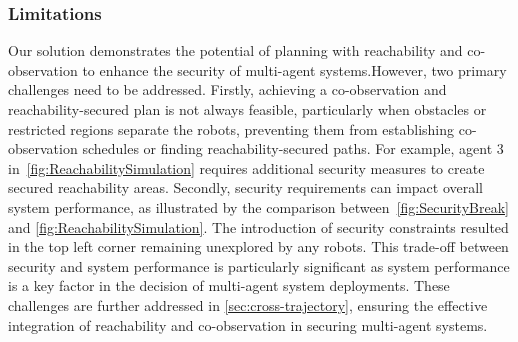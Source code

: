 \documentclass[10pt,twocolumn,twoside]{IEEEtran}
\newcommand{\news}{\color{blue}}
\begin{document}



\subsubsection{Limitations}\label{sec:reachability-discussion}
Our solution demonstrates the potential of planning with reachability and co-observation to enhance the security of multi-agent systems.{\news However, two primary challenges need to be addressed. Firstly, achieving a co-observation and reachability-secured plan is not always feasible, particularly when obstacles or restricted regions separate the robots, preventing them from establishing co-observation schedules or finding reachability-secured paths. For example, agent 3 in~\cref{fig:ReachabilitySimulation} requires additional security measures to create secured reachability areas. Secondly, security requirements can impact overall system performance, as illustrated by the comparison between~\cref{fig:SecurityBreak} and \cref{fig:ReachabilitySimulation}. The introduction of security constraints resulted in the top left corner remaining unexplored by any robots. This trade-off between security and system performance is particularly significant as system performance is a key factor in the decision of multi-agent system deployments. These challenges are further addressed in \cref{sec:cross-trajectory}, ensuring the effective integration of reachability and co-observation in securing multi-agent systems.}
\end{document}

